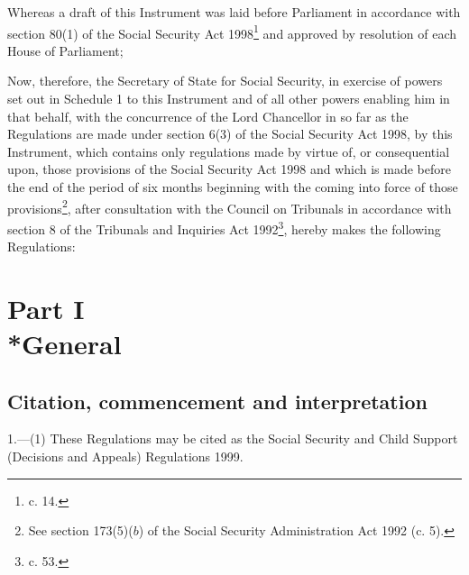 \documentclass[12pt,a4paper]{article}
\title{\regstitle}
\author{S.I. 1999 No. 991}
\date{Made 26th March 1999\\Coming into force in accordance with regulation 1(2)}
\begin{document}
\maketitle

\noindent
Whereas a draft of this Instrument was laid before Parliament in accordance with section 80(1) of the Social Security Act 1998\footnote{ c. 14.} and approved by resolution of each House of Parliament;

 Now, therefore, the Secretary of State for Social Security, in exercise of powers set out in Schedule 1 to this Instrument and of all other powers enabling him in that behalf, with the concurrence of the Lord Chancellor in so far as the Regulations are made under section 6(3) of the Social Security Act 1998, by this Instrument, which contains only regulations made by virtue of, or consequential upon, those provisions of the Social Security Act 1998 and which is made before the end of the period of six months beginning with the coming into force of those provisions\footnote{\frenchspacing See section 173(5)($b$) of the Social Security Administration Act 1992 (c. 5).}, after consultation with the Council on Tribunals in accordance with section 8 of the Tribunals and Inquiries Act 1992\footnote{ c. 53.}, hereby makes the following Regulations:

{\sloppy

\tableofcontents

}

\bigskip

\setcounter{secnumdepth}{-2}

\section[Part I --- General]{Part I\\*General}

\renewcommand\parthead{--- Part I}

\subsection[1. Citation, commencement and interpretation]{Citation, commencement and interpretation}

1.—(1) These Regulations may be cited as the Social Security and Child Support (Decisions and Appeals) Regulations 1999.
\end{document}

